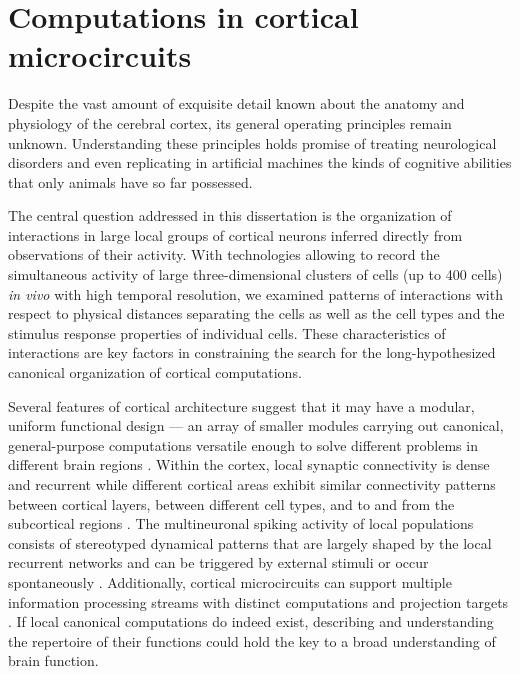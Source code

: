 \section{Computations in cortical microcircuits}

Despite the vast amount of exquisite detail known about the anatomy and physiology of the cerebral cortex, its general operating principles remain unknown. 
Understanding these principles holds promise of treating neurological disorders and even replicating in artificial machines the kinds of cognitive abilities that only animals have so far possessed.

The central question addressed in this dissertation is the organization of interactions in large local groups of cortical neurons inferred directly from observations of their activity. With technologies allowing to record the simultaneous activity of large three-dimensional clusters of cells (up to 400 cells) \emph{in vivo} with high temporal resolution, we examined patterns of interactions with respect to physical distances separating the cells as well as the cell types and the stimulus response properties of individual cells. These characteristics of interactions are key factors in constraining the search for the long-hypothesized canonical organization of cortical computations.

Several features of cortical architecture suggest that it may have a modular, uniform functional design --- an array of smaller modules carrying out canonical, general-purpose computations versatile enough to solve different problems in different brain regions \citep{Mountcastle:1997, Douglas:2007}. 
Within the cortex, local synaptic connectivity is dense and recurrent while different cortical areas exhibit similar connectivity patterns between cortical layers, between different cell types, and to and from the subcortical regions \citep{Douglas:2004,Harris:2013}. 
The multineuronal spiking activity of local populations consists of stereotyped dynamical patterns that are largely shaped by the local recurrent networks and can be triggered by external stimuli or occur spontaneously \citep{MacLean:2005,Luczak:2009,Harris:2011,Hofer:2011,Miller:2014}. 
Additionally, cortical microcircuits can support multiple information processing streams with distinct computations and projection targets \citep{Velez:2014}.
If local canonical computations do indeed exist, describing and understanding the repertoire of their functions could hold the key to a broad understanding of brain function.

